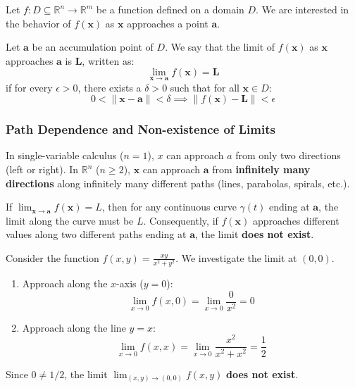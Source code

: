 Let $f: D \subseteq \mathbb{R}^n \to \mathbb{R}^m$ be a function defined on a domain $D$. We are interested in the behavior of $f(\mathbf{x})$ as $\mathbf{x}$ approaches a point $\mathbf{a}$.

\begin{definition}[Limit]
Let $\mathbf{a}$ be an accumulation point of $D$. We say that the limit of $f(\mathbf{x})$ as $\mathbf{x}$ approaches $\mathbf{a}$ is $\mathbf{L}$, written as:
\[ \lim_{\mathbf{x} \to \mathbf{a}} f(\mathbf{x}) = \mathbf{L} \]
if for every $\epsilon > 0$, there exists a $\delta > 0$ such that for all $\mathbf{x} \in D$:
\[ 0 < \|\mathbf{x} - \mathbf{a}\| < \delta \implies \|f(\mathbf{x}) - \mathbf{L}\| < \epsilon \]
\end{definition}

\subsubsection{Path Dependence and Non-existence of Limits}

In single-variable calculus ($n=1$), $x$ can approach $a$ from only two directions (left or right). In $\mathbb{R}^n$ ($n \ge 2$), $\mathbf{x}$ can approach $\mathbf{a}$ from \textbf{infinitely many directions} along infinitely many different paths (lines, parabolas, spirals, etc.).

\begin{theorem}
If $\lim_{\mathbf{x} \to \mathbf{a}} f(\mathbf{x}) = L$, then for any continuous curve $\gamma(t)$ ending at $\mathbf{a}$, the limit along the curve must be $L$.
Consequently, if $f(\mathbf{x})$ approaches different values along two different paths ending at $\mathbf{a}$, the limit \textbf{does not exist}.
\end{theorem}

\begin{example}
Consider the function $f(x, y) = \frac{xy}{x^2 + y^2}$. We investigate the limit at $(0,0)$.
\begin{enumerate}
    \item Approach along the $x$-axis ($y=0$):
    \[ \lim_{x \to 0} f(x, 0) = \lim_{x \to 0} \frac{0}{x^2} = 0 \]
    \item Approach along the line $y=x$:
    \[ \lim_{x \to 0} f(x, x) = \lim_{x \to 0} \frac{x^2}{x^2 + x^2} = \frac{1}{2} \]
\end{enumerate}
Since $0 \ne 1/2$, the limit $\lim_{(x,y) \to (0,0)} f(x,y)$ \textbf{does not exist}.
\end{example}

